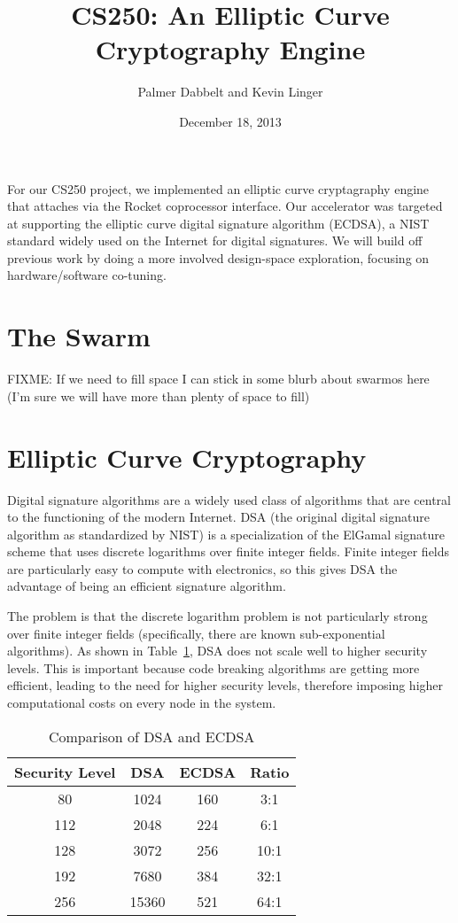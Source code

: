 \documentclass[twocolumn]{article}
\title{CS250: An Elliptic Curve Cryptography Engine}
\author{Palmer Dabbelt and Kevin Linger}
\date{December 18, 2013}
\begin{document}
\maketitle

For our CS250 project, we implemented an elliptic curve cryptagraphy
engine that attaches via the Rocket coprocessor interface.  Our
accelerator was targeted at supporting the elliptic curve digital
signature algorithm (ECDSA), a NIST standard widely used on the
Internet for digital signatures.  We will build off previous work by
doing a more involved design-space exploration, focusing on
hardware/software co-tuning.

\section{The Swarm}

FIXME: If we need to fill space I can stick in some blurb about
swarmos here
(I'm sure we will have more than plenty of space to fill)

\section{Elliptic Curve Cryptography}

Digital signature algorithms\cite{fips-186-3} are a widely used class
of algorithms that are central to the functioning of the modern
Internet.  DSA\cite{us-dsa} (the original digital signature algorithm
as standardized by NIST) is a specialization of the ElGamal signature
scheme\cite{elgamal-sig} that uses discrete logarithms over finite
integer fields.  Finite integer fields are particularly easy to
compute with electronics, so this gives DSA the advantage of being an
efficient signature algorithm.

The problem is that the discrete logarithm problem is not particularly
strong over finite integer fields (specifically, there are known
sub-exponential algorithms\cite{adleman-subexp}).  As shown in
Table~\ref{key-sizes}, DSA does not scale well to higher security
levels.  This is important because code breaking algorithms are
getting more efficient, leading to the need for higher security
levels, therefore imposing higher computational costs on every node in
the system. 

\begin{table}[h]
  \begin{center}
    \begin{tabular}{cccc}
      Security Level & DSA & ECDSA & Ratio \\
      \hline
      80 & 1024 & 160 & 3:1 \\
      112 & 2048 & 224 & 6:1 \\
      128 & 3072 & 256 & 10:1 \\
      192 & 7680 & 384 & 32:1 \\
      256 & 15360 & 521 & 64:1 \\
    \end{tabular}
  \end{center}

  \caption{Comparison of DSA and ECDSA\cite{nsa-case_for_ecc}
    \label{key-sizes}}
\end{table}
\end{document}
